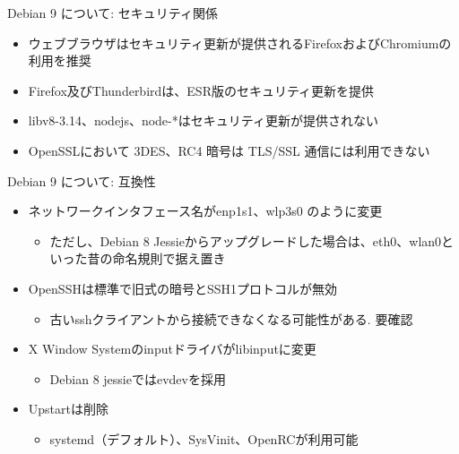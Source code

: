 \documentclass[cjk,c,squeeze,shrink,dvipdfmx,12pt]{beamer}
\begin{document}
\begin{frame}[fragile]{Debian 9 について: セキュリティ関係}%

\begin{itemize}
\item ウェブブラウザはセキュリティ更新が提供されるFirefoxおよびChromiumの利用を推奨
\item Firefox及びThunderbirdは、ESR版のセキュリティ更新を提供
\item libv8-3.14、nodejs、node-*はセキュリティ更新が提供されない
\item OpenSSLにおいて 3DES、RC4 暗号は TLS/SSL 通信には利用できない
\end{itemize}

\end{frame}


\begin{frame}[fragile]{Debian 9 について: 互換性}%

\begin{itemize}
\item ネットワークインタフェース名がenp1s1、wlp3s0 のように変更
  \begin{itemize}
  \item ただし、Debian 8 Jessieからアップグレードした場合は、eth0、wlan0といった昔の命名規則で据え置き
  \end{itemize}
\item OpenSSHは標準で旧式の暗号とSSH1プロトコルが無効
  \begin{itemize}
  \item 古いsshクライアントから接続できなくなる可能性がある. 要確認
  \end{itemize}
\item X Window Systemのinputドライバがlibinputに変更
  \begin{itemize}
  \item Debian 8 jessieではevdevを採用
  \end{itemize}
\item Upstartは削除
  \begin{itemize}
  \item systemd（デフォルト）、SysVinit、OpenRCが利用可能
  \end{itemize}
\end{itemize}

\end{frame}
\end{document}

